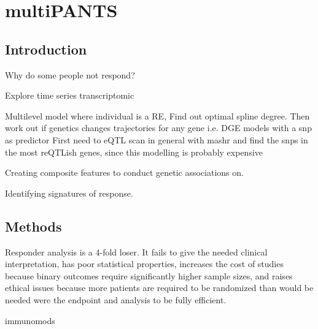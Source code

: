 %
%

\chapter{multiPANTS}

\section{Introduction}

Why do some people not respond?

Explore time series transcriptomic

Multilevel model where individual is a RE, 
Find out optimal spline degree.
Then work out if genetics changes trajectories for any gene i.e. DGE models with a snp as predictor
First need to eQTL scan in general with mashr and find the snps in the most reQTLish genes, since this modelling is probably expensive

Creating composite features to conduct genetic associations on.

Identifying signatures of response.

\section{Methods}

Responder analysis is a 4-fold loser. It fails to give the needed clinical
interpretation, has poor statistical properties, increases the cost of studies
because binary outcomes require significantly higher sample sizes, and raises
ethical issues because more patients are required to be randomized than would
be needed were the endpoint and analysis to be fully efficient.

immunomods

